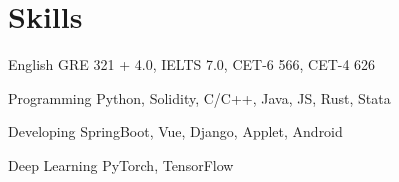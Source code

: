 \documentclass[12pt,letterpaper]{report}
\begin{document}

    \section*{Skills}
    \begin{tablist}
        \item[English] \tab{}\tab{}GRE 321 + 4.0, IELTS 7.0, CET-6 566, CET-4 626
        \item[Programming] \tab{}Python, Solidity, C/C++, Java, JS, Rust, Stata
        \item[Developing] \tab{}SpringBoot, Vue, Django, Applet, Android
        \item[Deep Learning] \tab{}PyTorch, TensorFlow
    \end{tablist}
\end{document}
